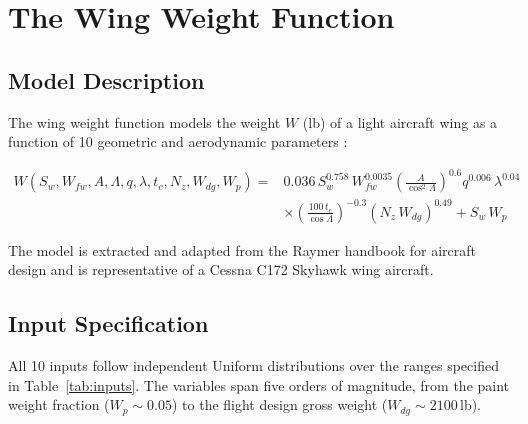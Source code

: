 \documentclass[11pt,a4paper]{article}
\begin{document}
\section{The Wing Weight Function}

\subsection{Model Description}

The wing weight function models the weight $W$ (lb) of a light aircraft wing as a function of 10 geometric and aerodynamic parameters \cite{Forrester2008,Surjanovic2024}:

\begin{equation}
\begin{aligned}
W(S_w, W_{fw}, A, \Lambda, q, \lambda, t_c, N_z, W_{dg}, W_p) =
&0.036\,S_w^{0.758}\,W_{fw}^{0.0035}
\left(\frac{A}{\cos^2\Lambda}\right)^{0.6}
q^{0.006}\,\lambda^{0.04} \\
&\times \left(\frac{100\,t_c}{\cos\Lambda}\right)^{-0.3}
(N_z\,W_{dg})^{0.49}
+ S_w\,W_p
\end{aligned}
\label{eq:wingweight}
\end{equation}

The model is extracted and adapted from the Raymer handbook for aircraft design \cite{Raymer2018} and is representative of a Cessna C172 Skyhawk wing aircraft.

\subsection{Input Specification}

All 10 inputs follow independent Uniform distributions over the ranges specified in Table~\ref{tab:inputs}. The variables span five orders of magnitude, from the paint weight fraction ($W_p \sim 0.05$) to the flight design gross weight ($W_{dg} \sim 2100$\,lb).
\end{document}
